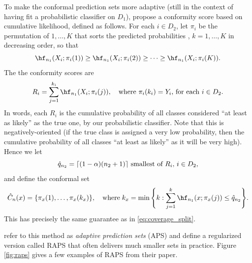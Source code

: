 \documentclass{article}
\begin{document}
To make the conformal prediction sets more adaptive (still in the context of
having fit a probabilistic classifier  on $D_1$),
\citet{romano2020classification} propose a conformity score based on cumulative
likelihood, defined as follows. For each $i \in D_2$, let $\pi_i$ be the
permutation of $1,\ldots,K$ that sorts the predicted probabilities
, $k=1,\dots,K$ in decreasing order, so that  
\[
\hf_{n_1}(X_i; \pi_i(1)) \geq \hf_{n_1}(X_i; \pi_i(2)) \geq \cdots \geq 
\hf_{n_1}(X_i; \pi_i(K)). 
\]
The the conformity scores are 
\[
R_i = \sum_{j=1}^{k_i} \hf_{n_1}(X_i; \pi_i(j)), \quad \text{where $\pi_i(k_i) =
  Y_i$, for each $i \in D_2$}.
\]
In words, each $R_i$ is the cumulative probability of all classes considered
``at least as likely'' as the true one, by our probabilistic classifier. Note
that this is negatively-oriented (if the true class is assigned a very low
probability, then the cumulative probability of all classes ``at least as
likely'' as it will be very high). Hence we let
\[
\text{$\hat{q}_{n_2} = \lceil (1-\alpha)(n_2+1) \rceil$ smallest of $R_i$, $i \in 
  D_2$},  
\]
and define the conformal set
\[
\hC_n(x) = \{ \pi_x(1), \ldots, \pi_x(k_x) \}, \quad \text{where} \; 
k_x =  \min\Bigg\{ k : \sum_{j=1}^k \hf_{n_1}(x; \pi_x(j)) \leq \hq_{n_2} 
\Bigg\}.
\]
This has precisely the same guarantee as in \eqref{eq:coverage_split}.

\citet{angelopoulos2021uncertainty} refer to this method as \emph{adaptive
  prediction sets} (APS) and define a regularized version called RAPS that often
delivers much smaller sets in practice. Figure \ref{fig:raps} gives a few
examples of RAPS from their paper.



\end{document}

